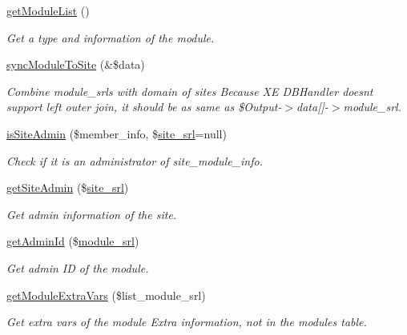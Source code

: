 \begin{DoxyCompactItemize}
\item 
\hyperlink{classmoduleModel_af51708f2ce0243f482bc92a453dd27c4}{get\+Module\+List} ()
\begin{DoxyCompactList}\small\item\em Get a type and information of the module. \end{DoxyCompactList}\item 
\hyperlink{classmoduleModel_ab51d556817682d653b92e09a34b138d6}{sync\+Module\+To\+Site} (\&\$data)
\begin{DoxyCompactList}\small\item\em Combine module\+\_\+srls with domain of sites Because X\+E D\+B\+Handler doesn\textquotesingle{}t support left outer join, it should be as same as \$\+Output-\/$>$data\mbox{[}\mbox{]}-\/$>$module\+\_\+srl. \end{DoxyCompactList}\item 
\hyperlink{classmoduleModel_aae55c42d2818ffd09f81d6cb215c59ff}{is\+Site\+Admin} (\$member\+\_\+info, \$\hyperlink{ko_8install_8php_a8b1406b4ad1048041558dce6bfe89004}{site\+\_\+srl}=null)
\begin{DoxyCompactList}\small\item\em Check if it is an administrator of site\+\_\+module\+\_\+info. \end{DoxyCompactList}\item 
\hyperlink{classmoduleModel_a6baa2faf83fc96fba51072276c9cb7c3}{get\+Site\+Admin} (\$\hyperlink{ko_8install_8php_a8b1406b4ad1048041558dce6bfe89004}{site\+\_\+srl})
\begin{DoxyCompactList}\small\item\em Get admin information of the site. \end{DoxyCompactList}\item 
\hyperlink{classmoduleModel_a302d180d2acef6331f9123d60f76c8c1}{get\+Admin\+Id} (\$\hyperlink{ko_8install_8php_a370bb6450fab1da3e0ed9f484a38b761}{module\+\_\+srl})
\begin{DoxyCompactList}\small\item\em Get admin I\+D of the module. \end{DoxyCompactList}\item 
\hyperlink{classmoduleModel_a4e93226573048a7b9c8e2cb842d0cb30}{get\+Module\+Extra\+Vars} (\$list\+\_\+module\+\_\+srl)
\begin{DoxyCompactList}\small\item\em Get extra vars of the module Extra information, not in the modules table. \end{DoxyCompactList}\item 

\end{DoxyCompactItemize}
